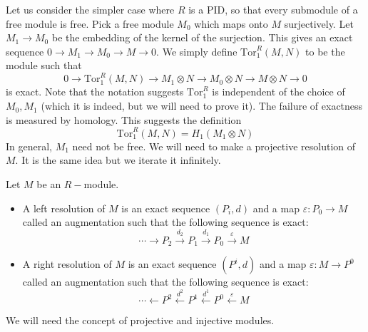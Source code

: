 \documentclass[12pt,reqno]{amsart}
\numberwithin{theorem}{section}
\theoremstyle{definition}
\theoremstyle{remark}
\numberwithin{equation}{section}
\theoremstyle{definition}
\newcommand{\Tor}{\mathrm{Tor}}
\begin{document}
Let us consider the simpler case where $R$ is a PID, so that every submodule of a free module is free. Pick a free module $M_0$ which maps onto $M$ surjectively. Let $M_1 \rightarrow M_0$ be the embedding of the kernel of the surjection. This gives an exact sequence $0 \rightarrow M_1 \rightarrow M_0 \rightarrow M \rightarrow 0$. We simply define $\Tor_1^R (M,N)$ to be the module such that
$$0 \rightarrow \Tor_1^R(M,N) \rightarrow M_1 \otimes N \rightarrow M_0 \otimes N \rightarrow M\otimes N \rightarrow 0$$
is exact. Note that the notation suggests $\Tor_1^R$ is independent of the choice of $M_0,M_1$ (which it is indeed, but we will need to prove it). The failure of exactness is measured by homology. This suggests the definition 
$$\Tor_1^R(M,N) = H_1(M_1\otimes N)$$
In general, $M_1$ need not be free. We will need to make a projective resolution of $M$. It is the same idea but we iterate it infinitely.
\begin{definition}
    Let $M$ be an $R-$module.
    \begin{itemize}
        \item A left resolution of $M$ is an exact sequence $(P_i,d)$ and a map $\varepsilon: P_0 \rightarrow M$ called an augmentation such that the following sequence is exact:
        $$\cdots \rightarrow P_2 \xrightarrow{d_2}P_1\xrightarrow{d_1}P_0 \xrightarrow{\varepsilon} M$$
        \item A right resolution of $M$ is an exact sequence $(P^i,d)$
        and a map $\varepsilon: M\rightarrow P^0$ called an augmentation such that the following sequence is exact:
        $$\cdots \leftarrow P^2 \xleftarrow{d^2}P^1\xleftarrow{d^1}P^0 \xleftarrow{\varepsilon} M$$
    \end{itemize}
\end{definition}
We will need the concept of projective and injective modules.
\end{document}
